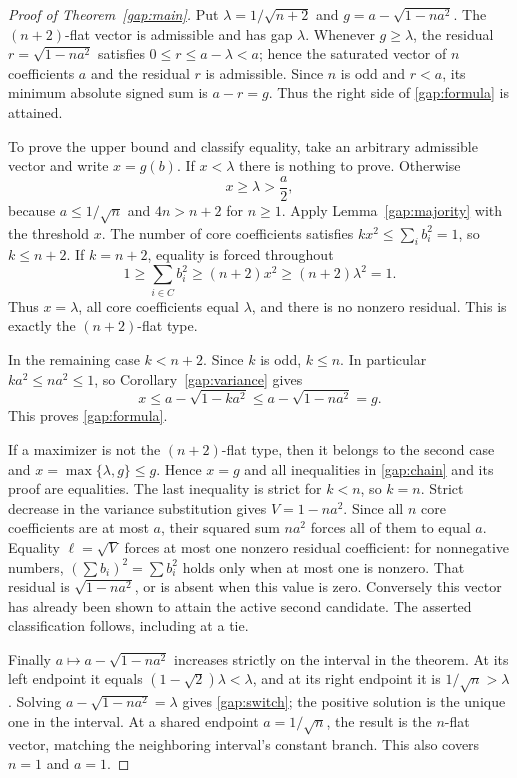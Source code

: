 \documentclass[11pt]{article}
\theoremstyle{remark}\newtheorem{remark}[theorem]{Remark}
\begin{document}
\begin{proof}[Proof of Theorem~\ref{gap:main}]
Put $\lambda=1/\sqrt{n+2}$ and $g=a-\sqrt{1-na^2}$.
The $(n+2)$-flat vector is admissible and has gap $\lambda$.
Whenever $g\ge\lambda$, the residual $r=\sqrt{1-na^2}$ satisfies
$0\le r\le a-\lambda<a$; hence the saturated vector of $n$
coefficients $a$ and the residual $r$ is admissible. Since $n$ is
odd and $r<a$, its minimum absolute signed sum is $a-r=g$.
Thus the right side of \eqref{gap:formula} is attained.

To prove the upper bound and classify equality, take an arbitrary
admissible vector and write $x=g(b)$.
If $x<\lambda$ there is nothing to prove. Otherwise
\[
 x\ge\lambda>\frac a2,
\]
because $a\le1/\sqrt n$ and $4n>n+2$ for $n\ge1$.
Apply Lemma~\ref{gap:majority} with the threshold $x$.
The number of core coefficients satisfies
$kx^2\le\sum_i b_i^2=1$, so $k\le n+2$.
If $k=n+2$, equality is forced throughout
\[
 1\ge\sum_{i\in C}b_i^2\ge(n+2)x^2\ge(n+2)\lambda^2=1.
\]
Thus $x=\lambda$, all core coefficients equal $\lambda$, and
there is no nonzero residual. This is exactly the $(n+2)$-flat type.

In the remaining case $k<n+2$. Since $k$ is odd, $k\le n$.
In particular $ka^2\le na^2\le1$, so
Corollary~\ref{gap:variance} gives
\begin{equation}\label{gap:chain}
 x\le a-\sqrt{1-ka^2}\le a-\sqrt{1-na^2}=g.
\end{equation}
This proves \eqref{gap:formula}.

If a maximizer is not the $(n+2)$-flat type, then it belongs to the
second case and $x=\max\{\lambda,g\}\le g$. Hence $x=g$ and
all inequalities in \eqref{gap:chain} and its proof are equalities.
The last inequality is strict for $k<n$, so $k=n$.
Strict decrease in the variance substitution gives
$V=1-na^2$. Since all $n$ core coefficients are at most $a$,
their squared sum $na^2$ forces all of them to equal $a$.
Equality $\ell=\sqrt V$ forces at most one nonzero residual
coefficient: for nonnegative numbers,
$(\sum b_i)^2=\sum b_i^2$ holds only when at most one is nonzero.
That residual is $\sqrt{1-na^2}$, or is absent when this value
is zero. Conversely this vector has already been shown to attain
the active second candidate. The asserted classification follows,
including at a tie.

Finally $a\mapsto a-\sqrt{1-na^2}$ increases strictly on the
interval in the theorem. At its left endpoint it equals
$(1-\sqrt2)\lambda<\lambda$, and at its right endpoint it is
$1/\sqrt n>\lambda$.
Solving $a-\sqrt{1-na^2}=\lambda$ gives
\eqref{gap:switch}; the positive solution is the unique one in
the interval. At a shared endpoint $a=1/\sqrt n$, the result
is the $n$-flat vector, matching the neighboring interval's
constant branch. This also covers $n=1$ and $a=1$.
\end{proof}
\end{document}
